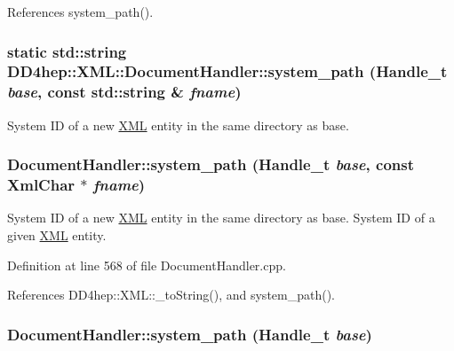 References system\_\-path().\hypertarget{class_d_d4hep_1_1_x_m_l_1_1_document_handler_a86278c2d562210ce1c6cbf31cba46a86}{
\subsubsection[{system\_\-path}]{\setlength{\rightskip}{0pt plus 5cm}static std::string DD4hep::XML::DocumentHandler::system\_\-path ({\bf Handle\_\-t} {\em base}, \/  const std::string \& {\em fname})}}
\label{class_d_d4hep_1_1_x_m_l_1_1_document_handler_a86278c2d562210ce1c6cbf31cba46a86}


System ID of a new \hyperlink{namespace_d_d4hep_1_1_x_m_l}{XML} entity in the same directory as base. \hypertarget{class_d_d4hep_1_1_x_m_l_1_1_document_handler_a6cc1864ffc55f0a9168f5238ea5c06fd}{
\subsubsection[{system\_\-path}]{ DocumentHandler::system\_\-path ({\bf Handle\_\-t} {\em base}, \/  const {\bf XmlChar} $\ast$ {\em fname})}}
\label{class_d_d4hep_1_1_x_m_l_1_1_document_handler_a6cc1864ffc55f0a9168f5238ea5c06fd}


System ID of a new \hyperlink{namespace_d_d4hep_1_1_x_m_l}{XML} entity in the same directory as base. System ID of a given \hyperlink{namespace_d_d4hep_1_1_x_m_l}{XML} entity. 

Definition at line 568 of file DocumentHandler.cpp.

References DD4hep::XML::\_\-toString(), and system\_\-path().\hypertarget{class_d_d4hep_1_1_x_m_l_1_1_document_handler_a606d6b73c50047ecdb1df4c69be320f6}{
\subsubsection[{system\_\-path}]{ DocumentHandler::system\_\-path ({\bf Handle\_\-t} {\em base})}}
\label{class_d_d4hep_1_1_x_m_l_1_1_document_handler_a606d6b73c50047ecdb1df4c69be320f6}


